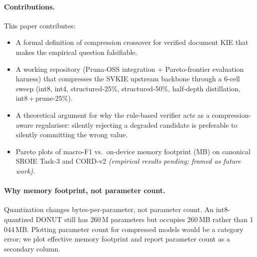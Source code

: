 \paragraph{Contributions.}  This paper contributes:

\begin{itemize}
\item A formal definition of compression crossover for verified
  document KIE that makes the empirical question falsifiable.
\item A working repository (Pruna-OSS integration + Pareto-frontier
  evaluation harness) that compresses the SVKIE upstream backbone
  through a 6-cell sweep (int8, int4, structured-25\%,
  structured-50\%, half-depth distillation, int8\,+\,prune-25\%).
\item A theoretical argument for why the rule-based verifier acts as
  a compression-aware regulariser: silently rejecting a degraded
  candidate is preferable to silently committing the wrong value.
\item Pareto plots of macro-F1 vs.\ on-device memory footprint
  (MB) on canonical SROIE Task-3 and CORD-v2 \emph{(empirical
  results pending; framed as future work)}.
\end{itemize}

\paragraph{Why memory footprint, not parameter count.}
Quantization changes bytes-per-parameter, not parameter count.  An
int8-quantized DONUT still has 260\,M parameters but occupies
260\,MB rather than 1\,044\,MB.  Plotting parameter count for
compressed models would be a category error; we plot effective
memory footprint and report parameter count as a secondary column.
